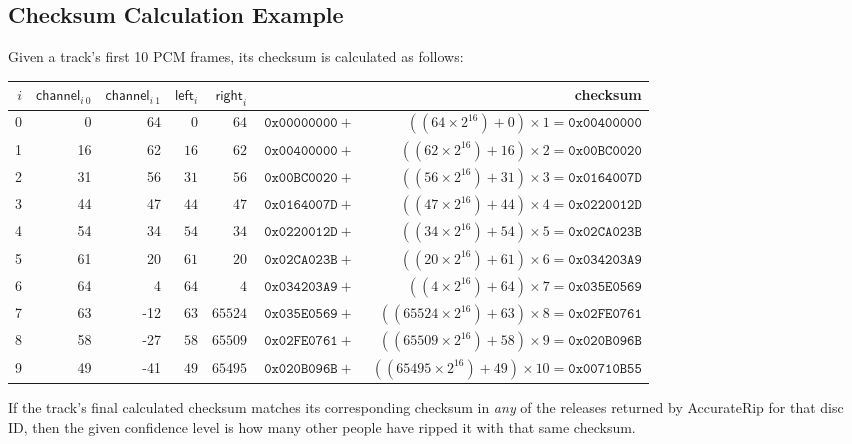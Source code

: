 \subsection{Checksum Calculation Example}
Given a track's first 10 PCM frames, its checksum is calculated as follows:
\begin{table}[h]
  {
  \begin{tabular}{r|rr|rr|lr}
    $i$ & $\textsf{channel}_{i~0}$ & $\textsf{channel}_{i~1}$ & $\textsf{left}_{i}$ & $\textsf{right}_{i}$ & & \textsf{checksum} \\
    \hline
    0 & 0 & 64 &
$0$ &
$64$ &
$\texttt{0x00000000}~+~$ &
$((64 \times 2 ^ {16}) + 0) \times 1 = \texttt{0x00400000}$
\\
1 & 16 & 62 &
$16$ &
$62$ &
$\texttt{0x00400000}~+~$ &
$((62 \times 2 ^ {16}) + 16) \times 2 = \texttt{0x00BC0020}$
\\
2 & 31 & 56 &
$31$ &
$56$ &
$\texttt{0x00BC0020}~+~$ &
$((56 \times 2 ^ {16}) + 31) \times 3 = \texttt{0x0164007D}$
\\
3 & 44 & 47 &
$44$ &
$47$ &
$\texttt{0x0164007D}~+~$ &
$((47 \times 2 ^ {16}) + 44) \times 4 = \texttt{0x0220012D}$
\\
4 & 54 & 34 &
$54$ &
$34$ &
$\texttt{0x0220012D}~+~$ &
$((34 \times 2 ^ {16}) + 54) \times 5 = \texttt{0x02CA023B}$
\\
5 & 61 & 20 &
$61$ &
$20$ &
$\texttt{0x02CA023B}~+~$ &
$((20 \times 2 ^ {16}) + 61) \times 6 = \texttt{0x034203A9}$
\\
6 & 64 & 4 &
$64$ &
$4$ &
$\texttt{0x034203A9}~+~$ &
$((4 \times 2 ^ {16}) + 64) \times 7 = \texttt{0x035E0569}$
\\
7 & 63 & -12 &
$63$ &
$65524$ &
$\texttt{0x035E0569}~+~$ &
$((65524 \times 2 ^ {16}) + 63) \times 8 = \texttt{0x02FE0761}$
\\
8 & 58 & -27 &
$58$ &
$65509$ &
$\texttt{0x02FE0761}~+~$ &
$((65509 \times 2 ^ {16}) + 58) \times 9 = \texttt{0x020B096B}$
\\
9 & 49 & -41 &
$49$ &
$65495$ &
$\texttt{0x020B096B}~+~$ &
$((65495 \times 2 ^ {16}) + 49) \times 10 = \texttt{0x00710B55}$
\\
  \end{tabular}
  }
\end{table}
\par
\noindent
If the track's final calculated checksum matches its corresponding
checksum in \textit{any} of the releases returned by AccurateRip
for that disc ID, then the given confidence level is how many other
people have ripped it with that same checksum.
